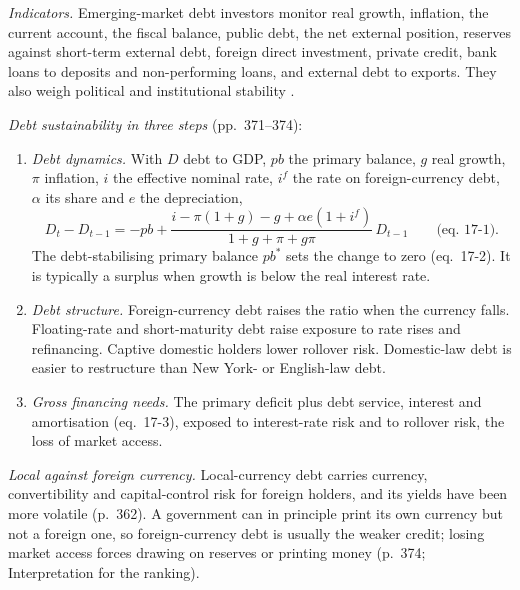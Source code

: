 \begin{qfmethod}\label{meth:sovereign-credit-analysis}
 \emph{Indicators.} Emerging-market debt investors monitor real growth, inflation, the current account, the fiscal balance, public debt, the net external position, reserves against short-term external debt, foreign direct investment, private credit, bank loans to deposits and non-performing loans, and external debt to exports. They also weigh political and institutional stability \citep[pp.~370--371]{s7-fabozzifixed}.

\emph{Debt sustainability in three steps} (pp.~371--374):
\begin{enumerate}
\item \emph{Debt dynamics.} With $D$ debt to GDP, $pb$ the primary balance, $g$ real growth, $\pi$ inflation, $i$ the effective nominal rate, $i^f$ the rate on foreign-currency debt, $\alpha$ its share and $e$ the depreciation,
\[ D_t-D_{t-1}=-pb+\frac{i-\pi(1+g)-g+\alpha e(1+i^f)}{1+g+\pi+g\pi}\,D_{t-1}\qquad\text{(eq.~17-1)}. \]
The debt-stabilising primary balance $pb^*$ sets the change to zero (eq.~17-2). It is typically a surplus when growth is below the real interest rate.
\item \emph{Debt structure.} Foreign-currency debt raises the ratio when the currency falls. Floating-rate and short-maturity debt raise exposure to rate rises and refinancing. Captive domestic holders lower rollover risk. Domestic-law debt is easier to restructure than New York- or English-law debt.
\item \emph{Gross financing needs.} The primary deficit plus debt service, interest and amortisation (eq.~17-3), exposed to interest-rate risk and to rollover risk, the loss of market access.
\end{enumerate}

\emph{Local against foreign currency.} Local-currency debt carries currency, convertibility and capital-control risk for foreign holders, and its yields have been more volatile (p.~362). A government can in principle print its own currency but not a foreign one, so foreign-currency debt is usually the weaker credit; losing market access forces drawing on reserves or printing money (p.~374; Interpretation for the ranking).


\end{qfmethod}
